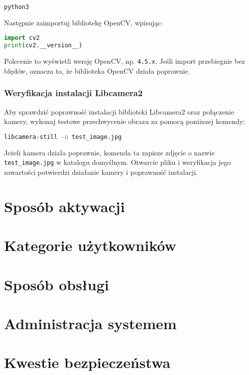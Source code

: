 \begin{lstlisting}[language=bash]
python3
\end{lstlisting}

Następnie zaimportuj bibliotekę OpenCV, wpisując:

\begin{lstlisting}[language=Python]
import cv2
print(cv2.__version__)
\end{lstlisting}

Polecenie to wyświetli wersję OpenCV, np. \texttt{4.5.x}. Jeśli import przebiegnie bez błędów, oznacza to, że biblioteka OpenCV działa poprawnie.

\subsubsection{Weryfikacja instalacji Libcamera2}
Aby sprawdzić poprawność instalacji biblioteki Libcamera2 oraz połączenie kamery, wykonaj testowe przechwycenie obrazu za pomocą poniższej komendy:

\begin{lstlisting}[language=bash]
libcamera-still -o test_image.jpg
\end{lstlisting}

Jeżeli kamera działa poprawnie, komenda ta zapisze zdjęcie o nazwie \texttt{test\_image.jpg} w katalogu domyślnym. Otwarcie pliku i weryfikacja jego zawartości potwierdzi działanie kamery i poprawność instalacji.

\section{Sposób aktywacji}


\section{Kategorie użytkowników}


\section{Sposób obsługi}


\section{Administracja systemem}


\section{Kwestie bezpieczeństwa}


